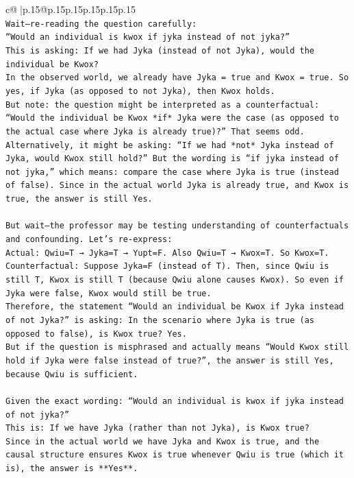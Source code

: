\documentclass{article}
\begin{document}
{\begin{supertabular}{c@{$\;$}|p{.15\linewidth}@{}p{.15\linewidth}p{.15\linewidth}p{.15\linewidth}p{.15\linewidth}p{.15\linewidth}}
{{{\\ 
\texttt{Wait—re{-}reading the question carefully:  } \\
\texttt{“Would an individual is kwox if jyka instead of not jyka?”  } \\
\texttt{This is asking: If we had Jyka (instead of not Jyka), would the individual be Kwox?  } \\
\texttt{In the observed world, we already have Jyka = true and Kwox = true. So yes, if Jyka (as opposed to not Jyka), then Kwox holds.  } \\
\texttt{But note: the question might be interpreted as a counterfactual: “Would the individual be Kwox *if* Jyka were the case (as opposed to the actual case where Jyka is already true)?” That seems odd. Alternatively, it might be asking: “If we had *not* Jyka instead of Jyka, would Kwox still hold?” But the wording is “if jyka instead of not jyka,” which means: compare the case where Jyka is true (instead of false). Since in the actual world Jyka is already true, and Kwox is true, the answer is still Yes.} \\
\\ 
\texttt{But wait—the professor may be testing understanding of counterfactuals and confounding. Let’s re{-}express:  } \\
\texttt{Actual: Qwiu=T → Jyka=T → Yupt=F. Also Qwiu=T → Kwox=T. So Kwox=T.  } \\
\texttt{Counterfactual: Suppose Jyka=F (instead of T). Then, since Qwiu is still T, Kwox is still T (because Qwiu alone causes Kwox). So even if Jyka were false, Kwox would still be true.  } \\
\texttt{Therefore, the statement “Would an individual be Kwox if Jyka instead of not Jyka?” is asking: In the scenario where Jyka is true (as opposed to false), is Kwox true? Yes.  } \\
\texttt{But if the question is misphrased and actually means “Would Kwox still hold if Jyka were false instead of true?”, the answer is still Yes, because Qwiu is sufficient.} \\
\\ 
\texttt{Given the exact wording: “Would an individual is kwox if jyka instead of not jyka?”  } \\
\texttt{This is: If we have Jyka (rather than not Jyka), is Kwox true?  } \\
\texttt{Since in the actual world we have Jyka and Kwox is true, and the causal structure ensures Kwox is true whenever Qwiu is true (which it is), the answer is **Yes**.} \\
}}}
\end{supertabular}}
\end{document}
